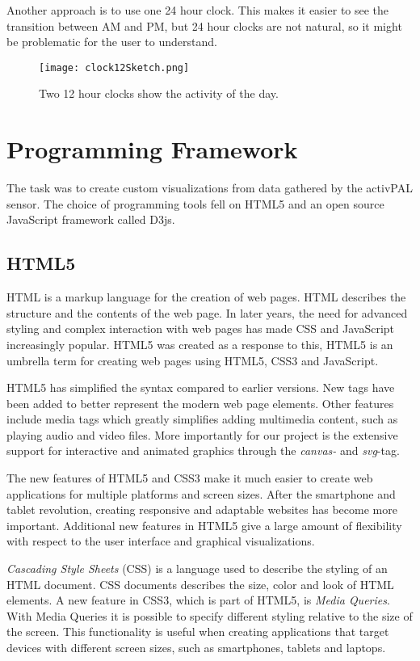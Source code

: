Another approach is to use one 24 hour clock. This makes it easier to see the transition between AM and PM, but 24 hour clocks are not natural, so it might be problematic for the user to understand.

\clearpage

\begin{figure}[t]
	\centering
		\texttt{[image: clock12Sketch.png]}
		\caption[T3 sketch]{Two 12 hour clocks show the activity of the day.}
		\label{fig:clock12}
\end{figure}

\section{Programming Framework}
The task was to create custom visualizations from data gathered by the activPAL sensor. The choice of programming tools fell on HTML5 and an open source JavaScript framework called D3js.

\subsection{HTML5}
HTML is a markup language for the creation of web pages. HTML describes the structure and the contents of the web page. In later years, the need for advanced styling and complex interaction with web pages has made CSS and JavaScript increasingly popular. HTML5 was created as a response to this, HTML5 is an umbrella term for creating web pages using HTML5, CSS3 and JavaScript.

HTML5 has simplified the syntax compared to earlier versions. New tags have been added to better represent the modern web page elements. Other features include media tags which greatly simplifies adding multimedia content, such as playing audio and video files. More importantly for our project is the extensive support for interactive and animated graphics through the \emph{canvas-} and \emph{svg}-tag.

The new features of HTML5 and CSS3 make it much easier to create web applications for multiple platforms and screen sizes. After the smartphone and tablet revolution, creating responsive and adaptable websites has become more important. Additional new features in HTML5 give a large amount of flexibility with respect to the user interface and graphical visualizations.

\emph{Cascading Style Sheets} (CSS) is a language used to describe the styling of an HTML document. CSS documents describes the size, color and look of HTML elements. A new feature in CSS3, which is part of HTML5, is \emph{Media Queries}. With Media Queries it is possible to specify different styling relative to the size of the screen. This functionality is useful when creating applications that target devices with different screen sizes, such as smartphones, tablets and laptops. 

